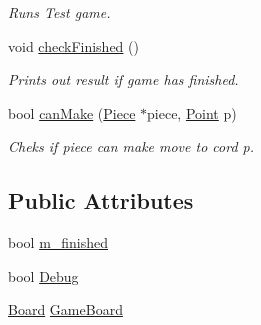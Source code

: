 \begin{DoxyCompactItemize}
\begin{DoxyCompactList}\small\item\em Runs Test game. \end{DoxyCompactList}\item 
\hypertarget{class_game_ae5be70ea28f2ec151cd93e86086f23a9}{void \hyperlink{class_game_ae5be70ea28f2ec151cd93e86086f23a9}{check\-Finished} ()}\label{class_game_ae5be70ea28f2ec151cd93e86086f23a9}

\begin{DoxyCompactList}\small\item\em Prints out result if game has finished. \end{DoxyCompactList}\item 
\hypertarget{class_game_a37edad1c1ded84b1735653f809ccb585}{bool \hyperlink{class_game_a37edad1c1ded84b1735653f809ccb585}{can\-Make} (\hyperlink{class_piece}{Piece} $\ast$piece, \hyperlink{struct_point}{Point} p)}\label{class_game_a37edad1c1ded84b1735653f809ccb585}

\begin{DoxyCompactList}\small\item\em Cheks if piece can make move to cord p. \end{DoxyCompactList}\end{DoxyCompactItemize}
\subsection*{Public Attributes}
\begin{DoxyCompactItemize}
\item 
bool \hyperlink{class_game_aee0b70deb19422d35b2061beb339bdf8}{m\-\_\-finished}
\item 
bool \hyperlink{class_game_ad79740c2d2fa299cf322bf6ea322d9aa}{Debug}
\item 
\hyperlink{class_board}{Board} \hyperlink{class_game_aeb67bc4fc06221330cfd7c862c85b66d}{Game\-Board}
\end{DoxyCompactItemize}

